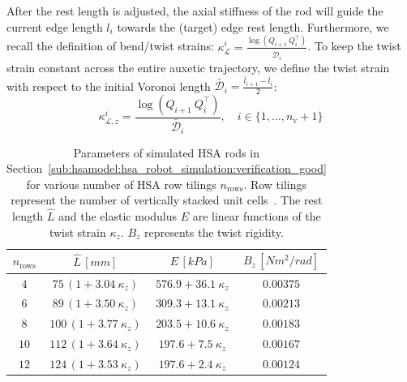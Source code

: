 After the rest length is adjusted, the axial stiffness of the rod will guide the current edge length $l_i$ towards the (target) edge rest length. %
Furthermore, we recall the definition of bend/twist strains: $\kappa_{\mathcal{L}}^i = \frac{\log(Q_{i+1} \: Q_i^\top)}{\hat{\mathcal{D}}_i}$. 
To keep the twist strain constant across the entire auxetic trajectory, we define the twist strain with respect to the initial Voronoi length $\bar{\mathcal{D}}_i = \frac{\bar{l}_{i+1} - \bar{l}_i}{2}$:
\begin{equation}
    \kappa_{\mathcal{L},z}^i = \frac{\log(Q_{i+1} \: Q_i^\top)}{\bar{\mathcal{D}}_i}, \quad i\in \{1,\dots,n_\mathrm{v}+1\}
\end{equation}

\begin{table}[hbt]
\centering
\caption{Parameters of simulated HSA rods in Section~\ref{sub:hsamodel:hsa_robot_simulation:verification_good} for various number of HSA row tilings $n_\mathrm{rows}$. Row tilings represent the number of vertically stacked unit cells~\citep{good2022expanding}. The rest length $\hat{L}$ and the elastic modulus $E$ are linear functions of the twist strain $\kappa_z$. $B_z$ represents the twist rigidity.}
\begin{tabular}{c ccc}\toprule
$n_\mathrm{rows}$ & $\hat{L} \, [\si{mm}]$ & $E \, [\si{kPa}]$ & $B_z \, [\si{Nm^2 \per rad}]$\\
\midrule
$4$ & $75 \, (1 + 3.04 \: \kappa_z)$ & $576.9 + 36.1 \: \kappa_z$ & $0.00375$\\
$6$ & $89 \, (1 + 3.50 \: \kappa_z)$ & $309.3 + 13.1 \: \kappa_z$ & $0.00213$\\
$8$ & $100 \, (1 + 3.77 \: \kappa_z)$ & $203.5 + 10.6 \: \kappa_z$ & $0.00183$\\
$10$ & $112 \, (1 + 3.64 \: \kappa_z)$ & $197.6 + 7.5 \: \kappa_z$ & $0.00167$\\
$12$ & $124 \, (1 + 3.53 \: \kappa_z)$ & $197.6 + 2.4 \: \kappa_z$ & $0.00124$\\
\bottomrule
\end{tabular}
\label{tab:hsamodel:hsa_rod_parameters_sim_verification}
\end{table}

